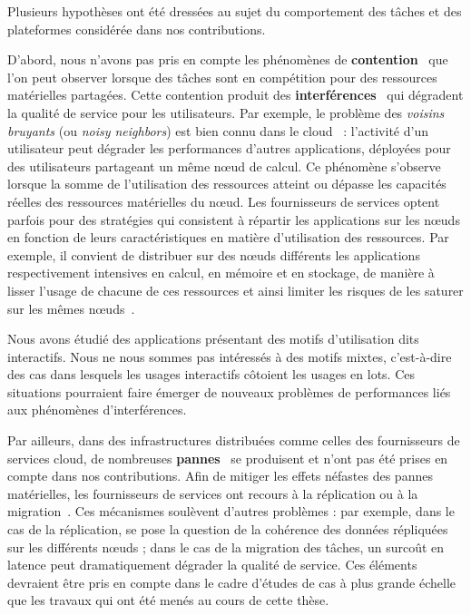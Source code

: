 Plusieurs hypothèses ont été dressées au sujet du comportement des tâches et des plateformes considérée dans nos contributions.

D'abord, nous n'avons pas pris en compte les phénomènes de \textbf{contention}~\cite{vanbeekCPUContentionPredictor2019, jacquetSweetspotVMOversubscribingCPU} que l'on peut observer lorsque des tâches sont en compétition pour des ressources matérielles partagées. Cette contention produit des \textbf{interférences}~\cite{kohAnalysisPerformanceInterference2007, vardasImprovedParallelApplication} qui dégradent la qualité de service pour les utilisateurs. Par exemple, le problème des \textit{voisins bruyants} (ou \textit{noisy neighbors}) est bien connu dans le cloud~\cite{robbagbyAntimodeleVoisinBruyant} : l'activité d'un utilisateur peut dégrader les performances d'autres applications, déployées pour des utilisateurs partageant un même nœud de calcul. Ce phénomène s'observe lorsque la somme de l'utilisation des ressources atteint ou dépasse les capacités réelles des ressources matérielles du nœud. Les fournisseurs de services optent parfois pour des stratégies qui consistent à répartir les applications sur les nœuds en fonction de leurs caractéristiques en matière d'utilisation des ressources. Par exemple, il convient de distribuer sur des nœuds différents les applications respectivement intensives en calcul, en mémoire et en stockage, de manière à lisser l'usage de chacune de ces ressources et ainsi limiter les risques de les saturer sur les mêmes nœuds~\cite{khandelwalTaureauDeconstructingServerless2020}.

Nous avons étudié des applications présentant des motifs d'utilisation dits interactifs. Nous ne nous sommes pas intéressés à des motifs mixtes, c'est-à-dire des cas dans lesquels les usages interactifs côtoient les usages en lots. Ces situations pourraient faire émerger de nouveaux problèmes de performances liés aux phénomènes d'interférences.

Par ailleurs, dans des infrastructures distribuées comme celles des fournisseurs de services cloud, de nombreuses \textbf{pannes}~\cite{javadiFailureTraceArchive2013, galletModelSpaceCorrelatedFailures2010, BareMetal70B} se produisent et n'ont pas été prises en compte dans nos contributions. Afin de mitiger les effets néfastes des pannes matérielles, les fournisseurs de services ont recours à la réplication ou à la migration~\cite{nazaricheraghlouSurveyFaultTolerance2016}. Ces mécanismes soulèvent d'autres problèmes : par exemple, dans le cas de la réplication, se pose la question de la cohérence des données répliquées sur les différents nœuds ; dans le cas de la migration des tâches, un surcoût en latence peut dramatiquement dégrader la qualité de service. Ces éléments devraient être pris en compte dans le cadre d'études de cas à plus grande échelle que les travaux qui ont été menés au cours de cette thèse.

